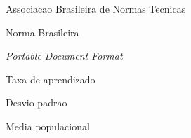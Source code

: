 %
%

\listoffigures*
\cleardoublepage

\listoftables*
\cleardoublepage

\begin{siglas}
  \item[ABNT] Associacao Brasileira de Normas Tecnicas
  \item[NBR] Norma Brasileira
  \item[PDF] \emph{Portable Document Format}
\end{siglas}

\begin{simbolos}
  \item[$\alpha$] Taxa de aprendizado
  \item[$\sigma$] Desvio padrao
  \item[$\mu$] Media populacional
\end{simbolos}
